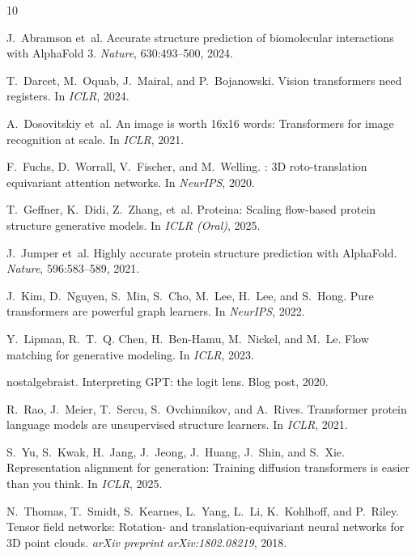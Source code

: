 \documentclass{article}
\begin{document}

\begin{thebibliography}{10}

J.~Abramson et~al.
\newblock Accurate structure prediction of biomolecular interactions with {AlphaFold} 3.
\newblock \emph{Nature}, 630:493--500, 2024.

T.~Darcet, M.~Oquab, J.~Mairal, and P.~Bojanowski.
\newblock Vision transformers need registers.
\newblock In \emph{ICLR}, 2024.

A.~Dosovitskiy et~al.
\newblock An image is worth 16x16 words: Transformers for image recognition at scale.
\newblock In \emph{ICLR}, 2021.


F.~Fuchs, D.~Worrall, V.~Fischer, and M.~Welling.
: 3{D} roto-translation equivariant attention networks.
\newblock In \emph{NeurIPS}, 2020.

T.~Geffner, K.~Didi, Z.~Zhang, et~al.
\newblock Proteina: Scaling flow-based protein structure generative models.
\newblock In \emph{ICLR (Oral)}, 2025.

J.~Jumper et~al.
\newblock Highly accurate protein structure prediction with {AlphaFold}.
\newblock \emph{Nature}, 596:583--589, 2021.

J.~Kim, D.~Nguyen, S.~Min, S.~Cho, M.~Lee, H.~Lee, and S.~Hong.
\newblock Pure transformers are powerful graph learners.
\newblock In \emph{NeurIPS}, 2022.

Y.~Lipman, R.~T.~Q. Chen, H.~Ben-Hamu, M.~Nickel, and M.~Le.
\newblock Flow matching for generative modeling.
\newblock In \emph{ICLR}, 2023.

nostalgebraist.
\newblock Interpreting {GPT}: the logit lens.
\newblock Blog post, 2020.

R.~Rao, J.~Meier, T.~Sercu, S.~Ovchinnikov, and A.~Rives.
\newblock Transformer protein language models are unsupervised structure learners.
\newblock In \emph{ICLR}, 2021.

S.~Yu, S.~Kwak, H.~Jang, J.~Jeong, J.~Huang, J.~Shin, and S.~Xie.
\newblock Representation alignment for generation: Training diffusion transformers is easier than you think.
\newblock In \emph{ICLR}, 2025.

N.~Thomas, T.~Smidt, S.~Kearnes, L.~Yang, L.~Li, K.~Kohlhoff, and P.~Riley.
\newblock Tensor field networks: Rotation- and translation-equivariant neural networks for {3D} point clouds.
\newblock \emph{arXiv preprint arXiv:1802.08219}, 2018.

\end{thebibliography}
\end{document}
